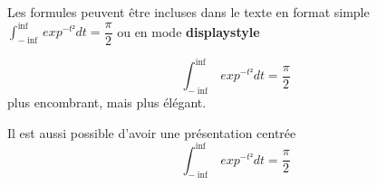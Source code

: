 \documentclass[a4paper]{article}
\begin{document}
Les formules peuvent être incluses dans le texte en format simple $\int^{\inf}_{-\inf}{exp^{-t²}dt}=\dfrac{\pi}{2}$ ou en mode \textbf{displaystyle}

$$\int^{\inf}_{-\inf}{exp^{-t²}dt}=\dfrac{\pi}{2} $$ plus encombrant, mais plus élégant.

Il est aussi possible d'avoir une présentation centrée
\begin{equation}
  \int^{\inf}_{-\inf}{exp^{-t²}dt}=\dfrac{\pi}{2}
\end{equation}
\end{document}
